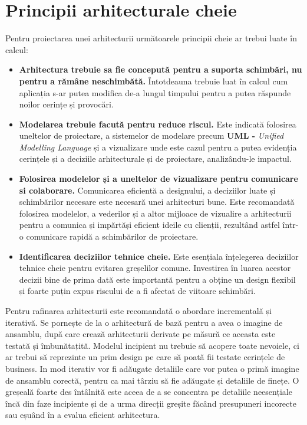 \documentclass[12pt, a4paper, oneside, romanian]{teza-upb}
\begin{document}
\section{Principii arhitecturale cheie}
Pentru proiectarea unei arhitecturii următoarele principii cheie ar trebui luate în calcul:
\begin{itemize}
	\item \textbf{Arhitectura trebuie sa fie concepută pentru a suporta schimbări, nu pentru a rămâne neschimbătă.} Întotdeauna trebuie luat în calcul cum aplicația s-ar putea modifica de-a lungul timpului pentru a putea răspunde noilor cerințe și provocări.
	\item \textbf{Modelarea trebuie facută pentru reduce riscul.} Este indicată folosirea uneltelor de proiectare, a sistemelor de modelare precum \textbf{UML -} \emph{Unified Modelling Language} și a vizualizare unde este cazul pentru a putea evidenția cerințele și a deciziile arhitecturale și de proiectare, analizându-le impactul.
	\item \textbf{Folosirea modelelor și a uneltelor de vizualizare pentru comunicare si colaborare.} Comunicarea eficientă a designului, a deciziilor luate și schimbărilor necesare este necesară unei arhitecturi bune. Este recomandată folosirea modelelor, a vederilor și a altor mijloace de vizualire a arhitecturii pentru a comunica și impărtăși eficient ideile cu clienții, rezultând astfel într-o comunicare rapidă a schimbărilor de proiectare.
	\item \textbf{Identificarea deciziilor tehnice cheie.} Este esențiala înțelegerea deciziilor tehnice cheie pentru evitarea greșelilor comune. Investirea în luarea acestor decizii bine de prima dată este importantă pentru a obține un design flexibil și foarte puțin expus riscului de a fi afectat de viitoare schimbări.
\end{itemize}

Pentru rafinarea arhitecturii este recomandată o abordare incrementală și iterativă. Se pornește de la o arhitectură de bază pentru a avea o imagine de ansamblu, după care crează arhitecturii derivate pe măsură ce aceasta este testată și îmbunătațită. Modelul incipient nu trebuie să acopere toate nevoiele, ci ar trebui să reprezinte un prim design pe care să poată fii testate cerințele de business. In mod iterativ vor fi adăugate detaliile care vor putea o primă imagine de ansamblu corectă, pentru ca mai târziu să fie adăugate și detaliile de finețe. O greșeală foarte des întâlnită este aceea de a se concentra pe detaliile neesențiale încă din faze incipiente și de a urma direcții greșite făcând presupuneri incorecte sau eșuând în a evalua eficient arhitectura. 
\end{document}

